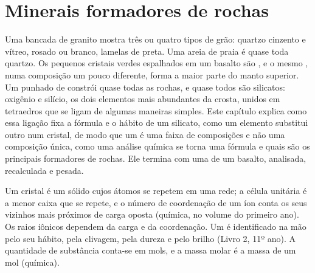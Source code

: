 \chapter{Minerais formadores de rochas}\label{ch:b1:rock-forming-minerals}

Uma bancada de granito mostra três ou quatro tipos de grão: quartzo cinzento e vítreo,  rosado ou branco, lamelas de  preta. Uma areia de praia é quase toda quartzo. Os pequenos cristais verdes espalhados em um basalto são , e o mesmo , numa composição um pouco diferente, forma a maior parte do manto superior. Um punhado de  constrói quase todas as rochas, e quase todos são silicatos: oxigênio e silício, os dois elementos mais abundantes da crosta, unidos em tetraedros que se ligam de algumas maneiras simples. Este capítulo explica como essa ligação fixa a fórmula e o hábito de um silicato, como um elemento substitui outro num cristal, de modo que um  é uma faixa de composições e não uma composição única, como uma análise química se torna uma fórmula e quais são os principais  formadores de rochas. Ele termina com uma  de um basalto, analisada, recalculada e pesada.

\begin{recall}
Um cristal é um sólido cujos átomos se repetem em uma rede; a célula unitária é a menor caixa que se repete, e o número de coordenação de um íon conta os seus vizinhos mais próximos de carga oposta (química, no volume do primeiro ano). Os raios iônicos dependem da carga e da coordenação. Um  é identificado na mão pelo seu hábito, pela clivagem, pela dureza e pelo brilho (Livro 2, 11º ano). A quantidade de substância conta-se em mols, e a massa molar é a massa de um mol (química).
\end{recall}

